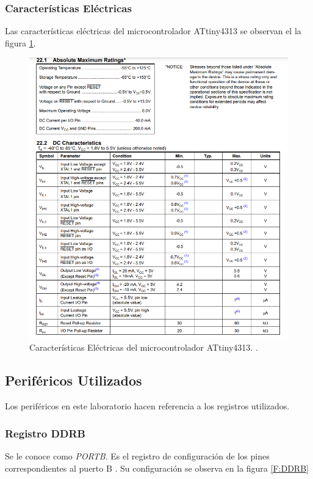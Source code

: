 \documentclass[12pt,letterpaper]{article}     %
\begin{document}
    \newpage
\subsubsection{Caracter\'isticas El\'ectricas}
Las caracter\'isticas el\'ectricas del microcontrolador  ATtiny4313 se observan el la figura \ref{F:ELEC}. 

\begin{figure}[H]
    \centering
    \includegraphics[width=1.0\textwidth]{imagenes/elec.PNG}
    \caption{Caracter\'isticas El\'ectricas del microcontrolador ATtiny4313. \cite{Microchip}.}
    \label{F:ELEC}
    \end{figure}


\subsection{Perif\'ericos Utilizados}
Los perif\'ericos en este laboratorio hacen referencia a los registros utilizados.
\subsubsection{Registro DDRB}
Se le conoce como \textit{PORTB}. Es el registro de configuraci\'on de los pines correspondientes al puerto B \cite{Microchip}. Su configuraci\'on se observa en la figura \ref{F:DDRB}
\end{document}
